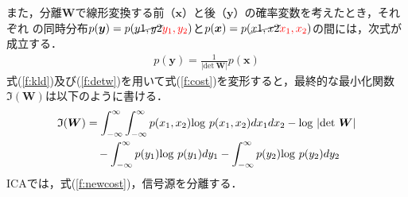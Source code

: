 また，分離$\bm{W}$で線形変換する前（$\bm{x}$）と後（$\bm{y}$）の確率変数を考えたとき，それぞれ
の同時分布$p(\bm{y}) = p(\cancel{y1,y2} \textcolor{red}{y_1,y_2}) $と$p(\bm{x}) = p(\cancel{x1,x2} \textcolor{red}{x_1,x_2})$の間には，次式が成立する．
\begin{align}
    p(\bm{y}) = \frac{1}{|\mathrm{det}~\bm{W}|}p(\bm{x}) \label{f:detw}
\end{align}
式(\ref{f:kld})及び(\ref{f:detw})を用いて式(\ref{f:cost})を変形すると，最終的な最小化関数$\mathfrak{I}(\bm{W})$は以下のように書ける．
\begin{align}
\begin{split}
  \mathfrak{I}(\bm{W}) &= \int_{-\infty}^{\infty} \int_{-\infty}^{\infty} p(x_1,x_2){\rm log}~p(x_1,x_2)dx_1 dx_2 - {\rm log}~|\mathrm{det}~\bm{W}|\\
  &\quad -\int_{-\infty}^{\infty} p(y_1){\rm log}~p(y_1)dy_1 - \int_{-\infty}^{\infty} p(y_2){\rm log}~p(y_2)dy_2    \label{f:newcost}
\end{split}
\end{align}
ICAでは，式(\ref{f:newcost})，信号源を分離する．

